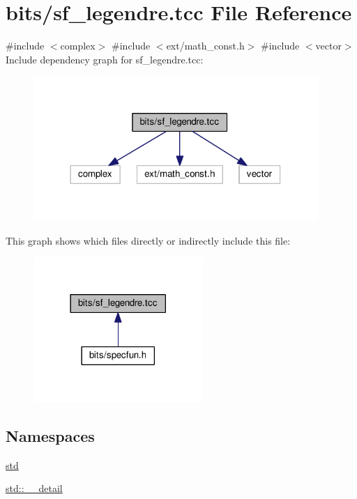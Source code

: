 \hypertarget{sf__legendre_8tcc}{}\section{bits/sf\+\_\+legendre.tcc File Reference}
\label{sf__legendre_8tcc}
{\ttfamily \#include $<$complex$>$}\newline
{\ttfamily \#include $<$ext/math\+\_\+const.\+h$>$}\newline
{\ttfamily \#include $<$vector$>$}\newline
Include dependency graph for sf\+\_\+legendre.\+tcc\+:
\nopagebreak
\begin{figure}[H]
\begin{center}
\leavevmode
\includegraphics[width=306pt]{sf__legendre_8tcc__incl}
\end{center}
\end{figure}
This graph shows which files directly or indirectly include this file\+:
\nopagebreak
\begin{figure}[H]
\begin{center}
\leavevmode
\includegraphics[width=182pt]{sf__legendre_8tcc__dep__incl}
\end{center}
\end{figure}
\subsection*{Namespaces}
\begin{DoxyCompactItemize}
\item 
 \hyperlink{namespacestd}{std}
\item 
 \hyperlink{namespacestd_1_1____detail}{std\+::\+\_\+\+\_\+detail}
\end{DoxyCompactItemize}
